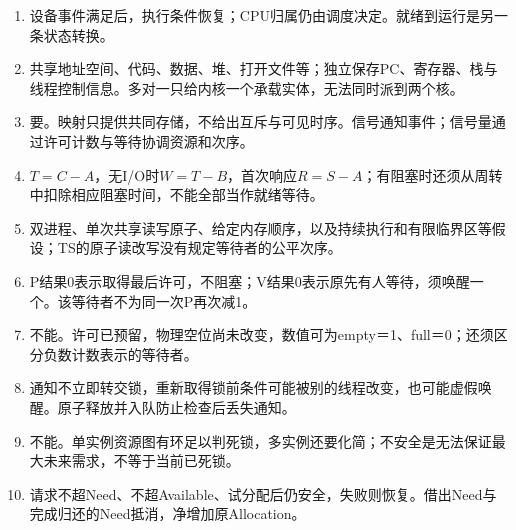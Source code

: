\begin{enumerate}
\def\labelenumi{\arabic{enumi}.}
\tightlist
\item
  设备事件满足后，执行条件恢复；CPU归属仍由调度决定。就绪到运行是另一条状态转换。
\item
  共享地址空间、代码、数据、堆、打开文件等；独立保存PC、寄存器、栈与线程控制信息。多对一只给内核一个承载实体，无法同时派到两个核。
\item
  要。映射只提供共同存储，不给出互斥与可见时序。信号通知事件；信号量通过许可计数与等待协调资源和次序。
\item
  \(T=C-A\)，无I/O时\(W=T-B\)，首次响应\(R=S-A\)；有阻塞时还须从周转中扣除相应阻塞时间，不能全部当作就绪等待。
\item
  双进程、单次共享读写原子、给定内存顺序，以及持续执行和有限临界区等假设；TS的原子读改写没有规定等待者的公平次序。
\item
  P结果0表示取得最后许可，不阻塞；V结果0表示原先有人等待，须唤醒一个。该等待者不为同一次P再次减1。
\item
  不能。许可已预留，物理空位尚未改变，数值可为empty＝1、full＝0；还须区分负数计数表示的等待者。
\item
  通知不立即转交锁，重新取得锁前条件可能被别的线程改变，也可能虚假唤醒。原子释放并入队防止检查后丢失通知。
\item
  不能。单实例资源图有环足以判死锁，多实例还要化简；不安全是无法保证最大未来需求，不等于当前已死锁。
\item
  请求不超Need、不超Available、试分配后仍安全，失败则恢复。借出Need与完成归还的Need抵消，净增加原Allocation。
\end{enumerate}
